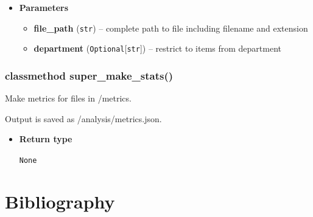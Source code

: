 \begin{itemize}
\item
  \textbf{Parameters}

  \begin{itemize}
  \item
    \textbf{file\_path} (\texttt{str}) -- complete path to file
    including filename and extension
  \item
    \textbf{department} (\texttt{Optional}{[}\texttt{str}{]}) --
    restrict to items from department
  \end{itemize}
\end{itemize}

\hypertarget{classmethod-super_make_stats}{%
\subsubsection{classmethod
super\_make\_stats()}\label{classmethod-super_make_stats}}

Make metrics for files in /metrics.

Output is saved as /analysis/metrics.json.

\begin{itemize}
\item
  \textbf{Return type}

  \texttt{None}
\end{itemize}

\hypertarget{bibliography}{%
\section{Bibliography}\label{bibliography}}

